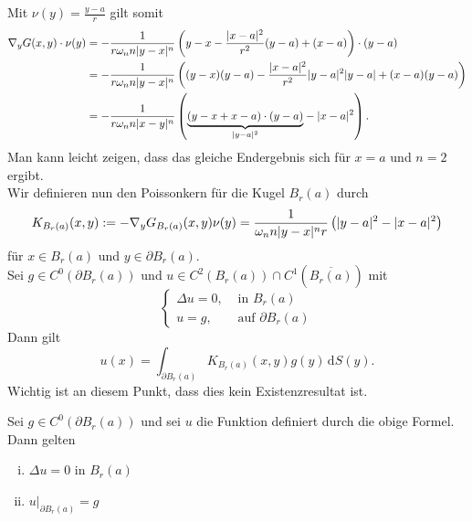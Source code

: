 	Mit $\nu(y)= \frac{y-a}{r}$ gilt somit
	\begin{align*}
		 \nabla_y G(x,y) \cdot \nu(y) &= - \frac{1}{r \omega_n n \lvert y-x\rvert^n} \left( y -x - \frac{\lvert x-a\rvert^2}{r^2}(y-a) + (x-a) \right) \cdot (y-a) \\
		 &= - \frac{1}{r \omega_n n \lvert y-x\rvert^n} \left( (y-x)(y-a) - \frac{\lvert x-a\rvert^2}{r^2} \lvert y-a\rvert^2 \lvert y-a\rvert + (x-a)(y-a) \right) \\
		 &= - \frac{1}{r \omega_n n \lvert x-y\rvert^n} \left( \underset{\lvert y-a\rvert^2}{\underbrace{(y-x+x-a) \cdot (y-a)}} - \lvert x-a\rvert^2 \right).
	\end{align*}
	Man kann leicht zeigen, dass das gleiche Endergebnis sich für $x=a$ und $n = 2$ ergibt. \\
	Wir definieren nun den Poissonkern für die Kugel $B_r(a)$ durch
	\[
		K_{B_r(a)}(x,y) := -  \nabla_y G_{B_r(a)}(x,y) \nu (y) = \frac{1}{\omega_n n \lvert y-x\rvert^n r} \left( \lvert y-a\rvert^2 - \lvert x-a\rvert^2 \right)
	\]
	für $x \in B_r(a)$ und $y \in \partial B_r(a)$. \\
	Sei $g \in C^0(\partial B_r(a))$ und $u \in C^2(B_r(a)) \cap C^1( \overline{B_r(a)})$ mit 
	\[
		\begin{cases}
			\Delta u = 0, &\text{ in }B_r(a)\\
			 u = g, &\text{ auf } \partial B_r(a)
		\end{cases}
	\]
	Dann gilt
	\[
		u(x) = \int_{\partial B_r(a) }^{} K_{B_r(a)}(x,y)g(y) \,\mathrm{d}S(y).
	\]
	Wichtig ist an diesem Punkt, dass dies kein Existenzresultat ist.
	\begin{satz}
		Sei $g \in C^0(\partial B_r(a))$ und sei $u$ die Funktion definiert durch die obige Formel. Dann gelten
		\begin{enumerate}[(i)]
			\item $ \Delta u = 0$ in $B_r(a)$
			\item $u  \Big|_{\partial B_r(a)}^{} = g$ 
		\end{enumerate}
	\end{satz}
